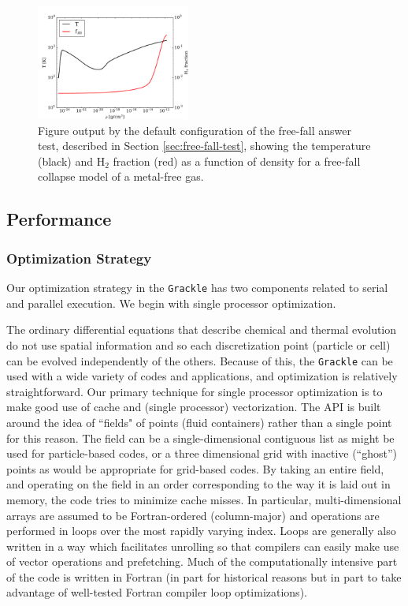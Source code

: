 \begin{figure}
  \centering
  \includegraphics[width=0.45\textwidth]{freefall.pdf}
  \caption{
    Figure output by the default configuration of the free-fall answer
    test, described in Section \ref{sec:free-fall-test}, showing the
    temperature (black) and H$_{2}$ fraction (red) as a function of
    density for a free-fall collapse model of a metal-free gas.
  } \label{fig:free-fall-test}
\end{figure}

\subsection{Performance}


\subsubsection{Optimization Strategy}

Our optimization strategy in the \texttt{Grackle} has two components related to serial and parallel execution.  We begin with single processor optimization.  

The ordinary differential equations that describe chemical and thermal evolution do not use spatial information and so each discretization point (particle or cell) can be evolved independently of the others.  Because of this, the \texttt{Grackle} can be used with a wide variety of codes and applications, and optimization is relatively straightforward.  Our primary technique for single processor optimization is to make good use of cache and (single processor) vectorization.  The API is built around the idea of ``fields" of points (fluid containers) rather than a single point for this reason.  The field can be a single-dimensional contiguous list as might be used for particle-based codes, or a three dimensional grid with inactive (``ghost'') points as would be appropriate for grid-based codes.  By taking an entire field, and operating on the field in an order corresponding to the way it is laid out in memory, the code tries to minimize cache misses.  In particular, multi-dimensional arrays are assumed to be Fortran-ordered (column-major) and operations are performed in loops over the most rapidly varying index.  Loops are generally also written in a way which facilitates unrolling so that compilers can easily make use of vector operations and prefetching.  Much of the computationally intensive part of the code is written in Fortran (in part for historical reasons but in part to take advantage of well-tested Fortran compiler loop optimizations).

